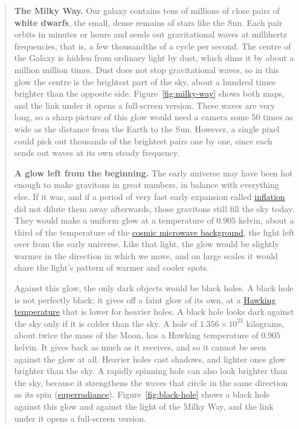 \begin{quote}
\textbf{The Milky Way.} Our galaxy contains tens of millions of close pairs of
\textbf{white dwarfs}, the small, dense remains of stars like the Sun. Each pair
orbits in minutes or hours and sends out gravitational waves at millihertz
frequencies, that is, a few thousandths of a cycle per second. The centre of the
Galaxy is hidden from ordinary light by dust, which dims it by about a million
million times. Dust does not stop gravitational waves, so in this glow the
centre is the brightest part of the sky, about a hundred times brighter than
the opposite side. Figure~\ref{fig:milky-way} shows both maps, and the link under it opens a full-screen version. These waves are very long, so a sharp picture of this glow
would need a camera some 50 times as wide as the distance from the Earth to
the Sun. However, a single pixel could pick out thousands of the brightest
pairs one by one, since each sends out waves at its own steady frequency.

\textbf{A glow left from the beginning.} The early universe may have been hot
enough to make gravitons in great numbers, in balance with everything else.
If it was, and if a period of very fast early expansion called
\href{https://en.wikipedia.org/wiki/Cosmic_inflation}{inflation} did not dilute
them away afterwards, those gravitons still fill the sky today. They would make
a uniform glow at a temperature of $0.905$ kelvin, about a third of the
temperature of the
\href{https://en.wikipedia.org/wiki/Cosmic_microwave_background}{cosmic
microwave background}, the light left over from the early universe. Like that
light, the glow would be slightly warmer in the direction in which we move, and
on large scales it would share the light's pattern of warmer and cooler spots.

Against this glow, the only dark objects would be black holes. A black hole is
not perfectly black: it gives off a faint glow of its own, at a
\href{https://en.wikipedia.org/wiki/Hawking_radiation}{Hawking temperature} that
is lower for heavier holes. A black hole looks dark against the sky only if it
is colder than the sky. A hole of $1.356\times10^{23}$ kilograms, about twice
the mass of the Moon, has a Hawking temperature of $0.905$ kelvin. It
gives back as much as it receives, and so it cannot be seen against the glow at
all. Heavier holes cast shadows, and lighter ones glow brighter than the sky. A
rapidly spinning hole can also look brighter than the sky, because it
strengthens the waves that circle in the same direction as its spin
(\href{https://en.wikipedia.org/wiki/Superradiance}{superradiance}). Figure~\ref{fig:black-hole} shows a black hole against this glow and against the light of the Milky Way, and the link under it opens a full-screen version.


\end{quote}
